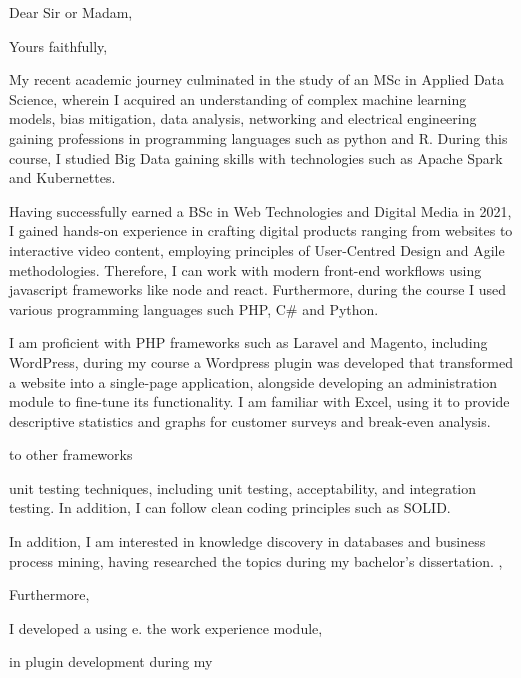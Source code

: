 \recipient{}


\date{\today}
\opening{Dear Sir or Madam,}
\closing{Yours faithfully,}

\makelettertitle

 My recent academic journey culminated in the study of an MSc in Applied Data Science, wherein I acquired an understanding of complex machine learning models, bias mitigation, data analysis, networking and electrical engineering gaining professions in programming languages such as python and R.  During this course, I studied Big Data gaining skills with technologies such as Apache Spark and Kubernettes.
 
 Having successfully earned a BSc in Web Technologies and Digital Media in 2021, I gained hands-on experience in crafting digital products ranging from websites to interactive video content, employing principles of User-Centred Design and Agile methodologies. Therefore, I can work with modern front-end workflows using javascript frameworks like node and react. Furthermore, during the course I used various programming languages such PHP, C# and Python. 
 
 
 I am proficient with PHP frameworks such as Laravel and Magento, including WordPress, during my course a Wordpress plugin was developed that transformed a website into a single-page application, alongside developing an administration module to fine-tune its functionality. 
I am familiar with Excel, using it to provide descriptive statistics and graphs for customer surveys and break-even analysis. 
 
 to other frameworks  

 
 unit testing techniques, including unit testing, acceptability, and integration testing. In addition, I can follow clean coding principles such as SOLID.
 
In addition, I am interested in knowledge discovery in databases and business process mining, having researched the topics during my bachelor's dissertation. , 







Furthermore,


I developed a using e. 
the work experience module, 




in plugin development during my 


\makeletterclosing